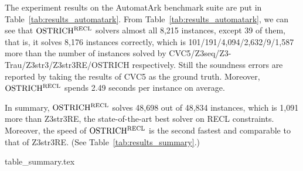 The experiment results on the AutomatArk benchmark suite are put in Table~\ref{tab:results_automatark}. 
From Table~\ref{tab:results_automatark}, we can see that $\rm OSTRICH^{RECL}$ solvers almost all 8,215 instances, except 39 of them, that is, it solves 8,176 instances correctly, which is %
101/191/4,094/2,632/9/1,587
more than the number of instances solved by CVC5/Z3seq/Z3-Trau/Z3str3/Z3str3RE/OSTRICH respectively. 
%    
Still the soundness errors are reported by taking the results of CVC5 as the ground truth.
%
Moreover, $\rm OSTRICH^{RECL}$ spends 2.49 seconds per instance on average. 

In summary, $\rm OSTRICH^{RECL}$ solves 48,698 out of 48,834 instances, which is 1,091 more than Z3str3RE, the state-of-the-art best solver on RECL constraints. Moreover, the speed of $\rm OSTRICH^{RECL}$ is the second fastest and comparable to that of Z3str3RE. (See Table~\ref{tab:results_summary}.)

\begin{table}[ht]
\vspace{-3mm}
\begin{center}
  {table_summary.tex}
\end{center}
  \caption{Experiment results: A Summary}
  \label{tab:results_summary}
\vspace{-6mm}
\end{table}





